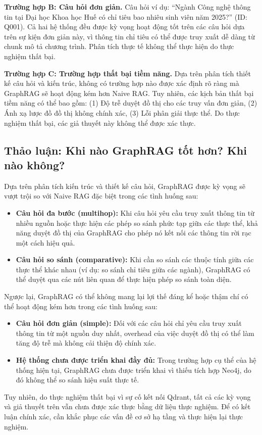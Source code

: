 \textbf{Trường hợp B: Câu hỏi đơn giản.} Câu hỏi ví dụ: ``Ngành Công nghệ thông tin tại Đại học Khoa học Huế có chỉ tiêu bao nhiêu sinh viên năm 2025?'' (ID: Q001). Cả hai hệ thống đều được kỳ vọng hoạt động tốt trên các câu hỏi dựa trên sự kiện đơn giản này, vì thông tin chỉ tiêu có thể được truy xuất dễ dàng từ chunk mô tả chương trình. Phân tích thực tế không thể thực hiện do thực nghiệm thất bại.

\textbf{Trường hợp C: Trường hợp thất bại tiềm năng.} Dựa trên phân tích thiết kế câu hỏi và kiến trúc, không có trường hợp nào được xác định rõ ràng mà GraphRAG sẽ hoạt động kém hơn Naive RAG. Tuy nhiên, các kịch bản thất bại tiềm năng có thể bao gồm: (1) Độ trễ duyệt đồ thị cho các truy vấn đơn giản, (2) Ánh xạ lược đồ đồ thị không chính xác, (3) Lỗi phân giải thực thể. Do thực nghiệm thất bại, các giả thuyết này không thể được xác thực.

\subsection{Thảo luận: Khi nào GraphRAG tốt hơn? Khi nào không?}
Dựa trên phân tích kiến trúc và thiết kế câu hỏi, GraphRAG được kỳ vọng sẽ vượt trội so với Naive RAG đặc biệt trong các tình huống sau:

\begin{itemize}
    \item \textbf{Câu hỏi đa bước (multihop):} Khi câu hỏi yêu cầu truy xuất thông tin từ nhiều nguồn hoặc thực hiện các phép so sánh phức tạp giữa các thực thể, khả năng duyệt đồ thị của GraphRAG cho phép nó kết nối các thông tin rời rạc một cách hiệu quả.
    \item \textbf{Câu hỏi so sánh (comparative):} Khi cần so sánh các thuộc tính giữa các thực thể khác nhau (ví dụ: so sánh chỉ tiêu giữa các ngành), GraphRAG có thể duyệt qua các nút liên quan để thực hiện phép so sánh toàn diện.
\end{itemize}

Ngược lại, GraphRAG có thể không mang lại lợi thế đáng kể hoặc thậm chí có thể hoạt động kém hơn trong các tình huống sau:

\begin{itemize}
    \item \textbf{Câu hỏi đơn giản (simple):} Đối với các câu hỏi chỉ yêu cầu truy xuất thông tin từ một nguồn duy nhất, overhead của việc duyệt đồ thị có thể làm tăng độ trễ mà không cải thiện độ chính xác.
    \item \textbf{Hệ thống chưa được triển khai đầy đủ:} Trong trường hợp cụ thể của hệ thống hiện tại, GraphRAG chưa được triển khai vì thiếu tích hợp Neo4j, do đó không thể so sánh hiệu suất thực tế.
\end{itemize}

Tuy nhiên, do thực nghiệm thất bại vì sự cố kết nối Qdrant, tất cả các kỳ vọng và giả thuyết trên vẫn chưa được xác thực bằng dữ liệu thực nghiệm. Để có kết luận chính xác, cần khắc phục các vấn đề cơ sở hạ tầng và thực hiện lại thực nghiệm.